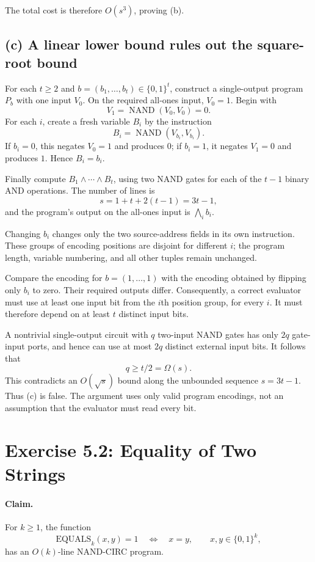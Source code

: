\documentclass[UTF8,fontset=fandol,11pt,a4paper]{ctexart}
\newcommand{\bits}{\{0,1\}}
\newcommand{\NAND}{\operatorname{NAND}}
\begin{document}
The total cost is therefore $O(s^3)$, proving (b).

\subsection*{(c) A linear lower bound rules out the square-root bound}
For each $t\ge2$ and $b=(b_1,\ldots,b_t)\in\bits^t$, construct a
single-output program $P_b$ with one input $V_0$. On the required
all-ones input, $V_0=1$. Begin with
\[
 V_1=\NAND(V_0,V_0)=0.
\]
For each $i$, create a fresh variable $B_i$ by the instruction
\[
 B_i=\NAND(V_{b_i},V_{b_i}).
\]
If $b_i=0$, this negates $V_0=1$ and produces $0$; if $b_i=1$, it
negates $V_1=0$ and produces $1$. Hence $B_i=b_i$.

Finally compute $B_1\land\cdots\land B_t$, using two NAND gates
for each of the $t-1$ binary AND operations. The number of lines is
\[
 s=1+t+2(t-1)=3t-1,
\]
and the program's output on the all-ones input is $\bigwedge_i b_i$.

Changing $b_i$ changes only the two source-address fields in its own
instruction. These groups of encoding positions are disjoint for
different $i$; the program length, variable numbering, and all other
tuples remain unchanged.

Compare the encoding for $b=(1,\ldots,1)$ with the encoding obtained
by flipping only $b_i$ to zero. Their required outputs differ.
Consequently, a correct evaluator must use at least one input bit
from the $i$th position group, for every $i$. It must therefore depend
on at least $t$ distinct input bits.

A nontrivial single-output circuit with $q$ two-input NAND gates has
only $2q$ gate-input ports, and hence can use at most $2q$ distinct
external input bits. It follows that
\[
 q\ge t/2=\Omega(s).
\]
This contradicts an $O(\sqrt{s})$ bound along the unbounded sequence
$s=3t-1$. Thus (c) is false. The argument uses only valid program
encodings, not an assumption that the evaluator must read every bit.

\section{Exercise 5.2: Equality of Two Strings}

\paragraph{Claim.}
For $k\ge1$, the function
\[
 \mathrm{EQUALS}_k(x,y)=1\quad\Longleftrightarrow\quad x=y,
 \qquad x,y\in\bits^k,
\]
has an $O(k)$-line NAND-CIRC program.
\end{document}
